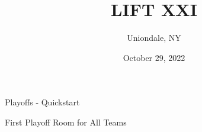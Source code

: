 \documentclass{article}%
\title{LIFT XXI}%
\author{Uniondale, NY}%
\date{October 29, 2022}%
\begin{document}
%
\normalsize%
%
\maketitle%
\vspace*{48pt}%
\begin{center}%
\begin{Huge}%
Playoffs {-} Quickstart%
\end{Huge}%
\end{center}%
\newpage%
\pagestyle{fancy}%
\fancyhf{}%
%
%
%
\begin{center}%
\begin{Huge}%
First Playoff Room for All Teams%
\end{Huge}%
\vspace*{12pt}%
\linebreak%
\end{center}%
%
%
\end{document}
